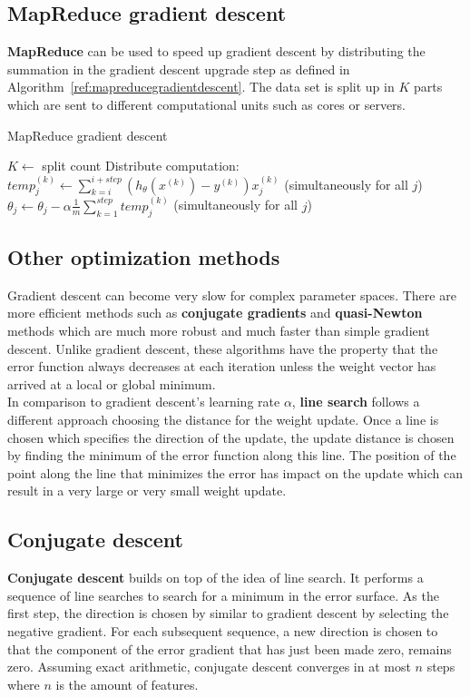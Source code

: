\documentclass{report}
\begin{document}
\subsection{MapReduce gradient descent}
{\bf MapReduce} can be used to speed up gradient descent by distributing the summation in the gradient descent upgrade step as defined in Algorithm~\ref{ref:mapreducegradientdescent}. The data set is split up in $K$ parts which are sent to different computational units such as cores or servers.

\begin{algorithm}
\caption{MapReduce gradient descent}
\label{ref:mapreducegradientdescent}
\begin{algorithmic}
\State $K\gets $ split count
\Repeat
{}
\State Distribute computation: $temp_j^{(k)}\gets \sum_{k=i}^{i+step}(h_\theta(x^{(k)})-y^{(k)})x_j^{(k)}$ (simultaneously for all $j$)
\EndFor
\State $\theta_j  \gets \theta_j - \alpha \frac{1}{m}\sum_{k=1}^{step}temp_j^{(k)}$ (simultaneously for all $j$)
\end{algorithmic}
\end{algorithm}

\subsection{Other optimization methods}
Gradient descent can become very slow for complex parameter spaces.
There are more efficient methods such as {\bf conjugate gradients} and {\bf quasi-Newton} methods which are much more robust and much faster than simple gradient descent.
Unlike gradient descent, these algorithms have the property that the error function always decreases at each iteration unless the weight vector has arrived at a local or global minimum. \\
In comparison to gradient descent's learning rate $\alpha$, {\bf line search} follows a different approach choosing the distance for the weight update.
Once a line is chosen which specifies the direction of the update, the update distance is chosen by finding the minimum of the error function along this line.
The position of the point along the line that minimizes the error has impact on the update which can result in a very large or very small weight update.

\subsection{Conjugate descent}
{\bf Conjugate descent} builds on top of the idea of line search. It performs a sequence of line searches to search for a minimum in the error surface.
As the first step, the direction is chosen by similar to gradient descent by selecting the negative gradient.
For each subsequent sequence, a new direction is chosen to that the component of the error gradient that has just been made zero, remains zero.
Assuming exact arithmetic, conjugate descent converges in at most $n$ steps where $n$ is the amount of features.
\end{document}
